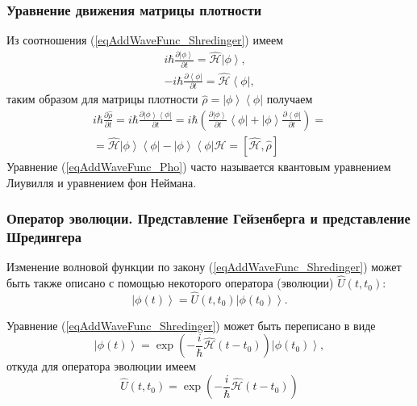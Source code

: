 \subsubsection{Уравнение движения матрицы плотности}
Из соотношения (\ref{eqAddWaveFunc_Shredinger}) имеем
\begin{eqnarray}
i \hbar \frac{\partial \left| \phi \right>}{\partial t} = \hat{\mathcal{H}}
\left| \phi \right>,
\nonumber \\
- i \hbar \frac{\partial \left< \phi \right|}{\partial t} = \hat{\mathcal{H}}
\left< \phi \right|,
\nonumber
\end{eqnarray}
таким образом для матрицы плотности 
$\hat{\rho} = \left| \phi \right>\left< \phi \right|$ получаем
\begin{eqnarray}
i \hbar \frac{\partial \hat{\rho} }{\partial t} = 
i \hbar \frac{\partial  \left| \phi \right>\left< \phi \right|
}{\partial t} = 
i \hbar \left( \frac{\partial \left| \phi \right>}{\partial t}\left< \phi
\right| +
\left| \phi \right> \frac{\partial \left< \phi \right|}{\partial t}
\right) =
\nonumber \\
=  \hat{\mathcal{H}} \left| \phi \right>\left< \phi \right| -
\left| \phi \right>\left< \phi \right|\hat{\mathcal{H}} = 
\left[ \hat{\mathcal{H}}, \hat{\rho} \right]
\label{eqAddWaveFunc_Pho}
\end{eqnarray}
Уравнение (\ref{eqAddWaveFunc_Pho}) часто называется квантовым
уравнением Лиувилля и уравнением фон Неймана.

\subsubsection{Оператор эволюции. Представление Гейзенберга и
  представление Шредингера}

Изменение волновой функции по закону (\ref{eqAddWaveFunc_Shredinger})
может быть также описано с помощью некоторого оператора (эволюции) $\hat{U}\left(t,t_0\right)$:
\begin{equation}
\left| \phi\left(t\right) \right> = 
\hat{U}\left(t,t_0\right)\left| \phi\left(t_0\right) \right>.
\label{eqAddWaveFunc_ShredingerU}
\end{equation}

Уравнение (\ref{eqAddWaveFunc_Shredinger}) может быть переписано в
виде
\begin{equation}
\left| \phi\left(t\right) \right> = 
\exp\left( -\frac{i}{\hbar} \hat{\mathcal{H}} \left( t - t_0 \right)  \right)
\left| \phi\left(t_0\right) \right>,
\nonumber
\end{equation}
откуда для оператора эволюции имеем
\begin{equation}
\hat{U}\left(t,t_0\right) = 
\exp\left( -\frac{i}{\hbar} \hat{\mathcal{H}} \left( t - t_0 \right)  \right)
\label{eqAddDiracEvolutionOper}
\end{equation}

